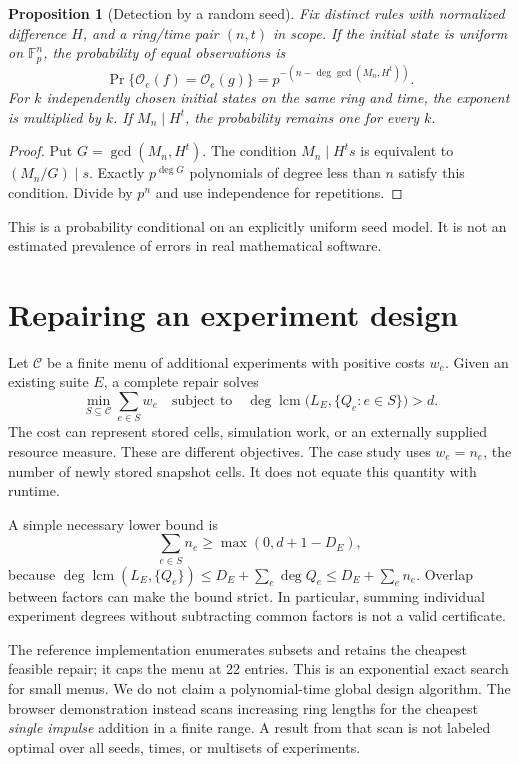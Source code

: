 \documentclass[11pt]{article}
\newtheorem{proposition}[theorem]{Proposition}
\newcommand{\Fp}{\mathbb F_p}
\newcommand{\Obs}{\mathcal O}
\newcommand{\lcmop}{\operatorname{lcm}}
\begin{document}
\begin{proposition}[Detection by a random seed]\label{prop:random}
Fix distinct rules with normalized difference $H$, and a ring/time pair $(n,t)$ in scope. If the initial state is uniform on $\Fp^n$, the probability of equal observations is
\begin{equation}
 \Pr\{\Obs_e(f)=\Obs_e(g)\}
 =p^{-\left(n-\deg\gcd(M_n,H^t)\right)}.
 \label{eq:random}
\end{equation}
For $k$ independently chosen initial states on the same ring and time, the exponent is multiplied by $k$. If $M_n\mid H^t$, the probability remains one for every $k$.
\end{proposition}
\begin{proof}
Put $G=\gcd(M_n,H^t)$. The condition $M_n\mid H^t s$ is equivalent to $(M_n/G)\mid s$. Exactly $p^{\deg G}$ polynomials of degree less than $n$ satisfy this condition. Divide by $p^n$ and use independence for repetitions.
\end{proof}
This is a probability conditional on an explicitly uniform seed model. It is not an estimated prevalence of errors in real mathematical software.

\section{Repairing an experiment design}
Let $\mathcal C$ be a finite menu of additional experiments with positive costs $w_e$. Given an existing suite $E$, a complete repair solves
\begin{equation}
 \min_{S\subseteq\mathcal C}\sum_{e\in S}w_e
 \quad\text{subject to}\quad
 \deg\lcmop\bigl(L_E,\{Q_e:e\in S\}\bigr)>d.
 \label{eq:repair}
\end{equation}
The cost can represent stored cells, simulation work, or an externally supplied resource measure. These are different objectives. The case study uses $w_e=n_e$, the number of newly stored snapshot cells. It does not equate this quantity with runtime.

A simple necessary lower bound is
\begin{equation}
 \sum_{e\in S}n_e\geq\max(0,d+1-D_E),
 \label{eq:lower}
\end{equation}
because $\deg\lcmop(L_E,\{Q_e\})\leq D_E+\sum_e\deg Q_e\leq D_E+\sum_e n_e$. Overlap between factors can make the bound strict. In particular, summing individual experiment degrees without subtracting common factors is not a valid certificate.

The reference implementation enumerates subsets and retains the cheapest feasible repair; it caps the menu at 22 entries. This is an exponential exact search for small menus. We do not claim a polynomial-time global design algorithm. The browser demonstration instead scans increasing ring lengths for the cheapest \emph{single impulse} addition in a finite range. A result from that scan is not labeled optimal over all seeds, times, or multisets of experiments.
\end{document}
